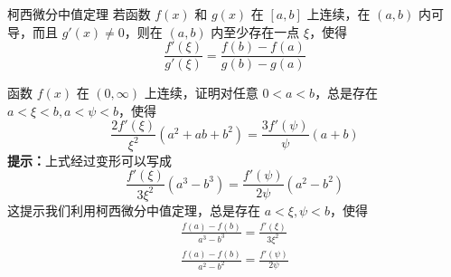 \begin{theorem}{柯西微分中值定理}
若函数 $f(x)$ 和 $g(x)$ 在 $[a,b]$ 上连续，在 $(a,b)$ 内可导，而且 $g'(x)\neq 0$，则在 $(a,b)$ 内至少存在一点 $\xi$，使得
\begin{equation}{}
\frac{f'(\xi)}{g'(\xi)}=\frac{f(b)-f(a)}{g(b)-g(a)}
\end{equation}
\end{theorem}
\begin{exercise}{}
函数 $f(x)$ 在 $(0,\infty)$ 上连续，证明对任意 $0 < a < b$，总是存在 $a < \xi < b, a< \psi <b$，使得
\begin{equation}
\frac{2f'(\xi)}{\xi^2}(a^2+ab+b^2)=\frac{3f'(\psi)}{\psi}(a+b)
\end{equation}
\textbf{提示：}上式经过变形可以写成
\begin{equation}
\frac{f'(\xi)}{3\xi^2}(a^3-b^3)=\frac{f'(\psi)}{2\psi}(a^2-b^2)
\end{equation}
这提示我们利用柯西微分中值定理，总是存在 $a<\xi,\psi<b$，使得
\begin{equation}
\begin{aligned}
\frac{f(a)-f(b)}{a^3-b^3}=\frac{f'(\xi)}{3\xi^2}\\
\frac{f(a)-f(b)}{a^2-b^2}=\frac{f'(\psi)}{2\psi}
\end{aligned}
\end{equation}
\end{exercise}